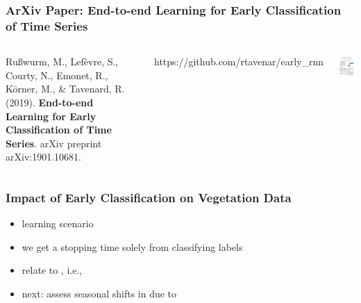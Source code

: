 \begin{frame}
\frametitle{ArXiv Paper: End-to-end Learning for Early Classification of Time Series}

\begin{columns}
	
	
	
	Rußwurm, M., Lefèvre, S., Courty, N., Emonet, R., Körner, M., \& Tavenard, R. (2019).\textbf{ End-to-end Learning for Early Classification of Time Series}. arXiv preprint arXiv:1901.10681.
	
	\vspace{1em}
	https://github.com/rtavenar/early\_rnn
	
	
	\includegraphics[width=4cm]{images/elects_arxiv}
	
\end{columns}

\end{frame}



\begin{frame}
	\frametitle{Impact of Early Classification on Vegetation Data}
	
	\Large
	
	\begin{itemize}[itemsep=1em]
		\item<1->  learning scenario
		\item<2-> we get a stopping time  solely from classifying labels
		\item<3-> relate to , i.e., 
		\item<4-> next: assess seasonal shifts in  due to 
	\end{itemize}
	
\end{frame}

